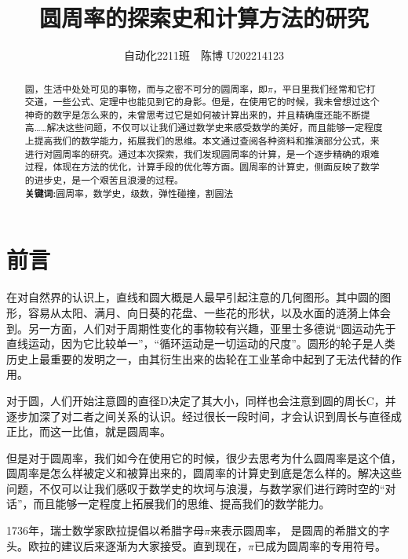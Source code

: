\documentclass[12pt,a4paper]{ctexart}
\title{\textbf{圆周率的探索史和计算方法的研究}}
\author{自动化2211班~~陈博 U202214123}
\date{}%
\begin{document}
	\maketitle
	\setcounter{page}{0}
	\maketitle
	\thispagestyle{empty}
	
	\begin{abstract}
		圆，生活中处处可见的事物，而与之密不可分的圆周率，即$\pi$，平日里我们经常和它打交道，一些公式、定理中也能见到它的身影。但是，在使用它的时候，我未曾想过这个神奇的数字是怎么来的，未曾思考过它是如何被计算出来的，并且精确度还能不断提高……解决这些问题，不仅可以让我们通过数学史来感受数学的美好，而且能够一定程度上提高我们的数学能力，拓展我们的思维。本文通过查阅各种资料和推演部分公式，来进行对圆周率的研究。通过本次探索，我们发现圆周率的计算，是一个逐步精确的艰难过程，体现在方法的优化，计算手段的优化等方面。圆周率的计算史，侧面反映了数学的进步史，是一个艰苦且浪漫的过程。
		\\\textbf{关键词:}圆周率，数学史，级数，弹性碰撞，割圆法
	\end{abstract}
	
	\setcounter{page}{1}
	\section{前言}
	在对自然界的认识上，直线和圆大概是人最早引起注意的几何图形。其中圆的图形，容易从太阳、满月、向日葵的花盘、一些花的形状，以及水面的涟漪上体会到。另一方面，人们对于周期性变化的事物较有兴趣，亚里士多德说“圆运动先于直线运动，因为它比较单一”，“循环运动是一切运动的尺度”。圆形的轮子是人类历史上最重要的发明之一，由其衍生出来的齿轮在工业革命中起到了无法代替的作用\cite{RN22}。
	
	对于圆，人们开始注意圆的直径D决定了其大小，同样也会注意到圆的周长C，并逐步加深了对二者之间关系的认识。经过很长一段时间，才会认识到周长与直径成正比，而这一比值，就是圆周率。
	
	但是对于圆周率，我们如今在使用它的时候，很少去思考为什么圆周率是这个值，圆周率是怎么样被定义和被算出来的，圆周率的计算史到底是怎么样的。解决这些问题，不仅可以让我们感叹于数学史的坎坷与浪漫，与数学家们进行跨时空的“对话”，而且能够一定程度上拓展我们的思维、提高我们的数学能力。
	
	1736年，瑞士数学家欧拉提倡以希腊字母$\pi$来表示圆周率， 是圆周的希腊文的字头。欧拉的建议后来逐渐为大家接受。直到现在，$\pi$已成为圆周率的专用符号。
	
\end{document}
